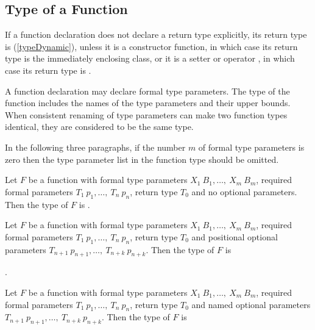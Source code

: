 \documentclass{article}
\begin{document}
\subsection{Type of a Function}

\LMHash{}
If a function declaration does not declare a return type explicitly, its return type is \DYNAMIC{} (\ref{typeDynamic}),
unless it is a constructor function, in which case its return type is the immediately enclosing class,
or it is a setter or operator \code{[]=}, in which case its return type is \VOID{}.

\LMHash{}
A function declaration may declare formal type parameters.
The type of the function includes the names of the type parameters and their upper bounds.
When consistent renaming of type parameters can make two function types identical,
they are considered to be the same type.


\LMHash{}
In the following three paragraphs,
if the number $m$ of formal type parameters is zero then the type parameter list in the function type should be omitted.

\LMHash{}
Let $F$ be a function with
formal type parameters $X_1\ B_1, \ldots,\ X_m\ B_m$,
required formal parameters $T_1\ p_1, \ldots,\ T_n\ p_n$,
return type $T_0$
and no optional parameters.
Then the type of $F$ is
.

\LMHash{}
Let $F$ be a function with
formal type parameters $X_1\ B_1, \ldots,\ X_m\ B_m$,
required formal parameters $T_1\ p_1, \ldots,\ T_n\ p_n$,
return type $T_0$
and positional optional parameters $T_{n+1}\ p_{n+1}, \ldots,\ T_{n+k}\ p_{n+k}$.
Then the type of $F$ is

.

\LMHash{}
Let $F$ be a function with
formal type parameters $X_1\ B_1, \ldots,\ X_m\ B_m$,
required formal parameters $T_1\ p_1, \ldots,\ T_n\ p_n$,
return type $T_0$
and named optional parameters $T_{n+1}\ p_{n+1}, \ldots,\ T_{n+k}\ p_{n+k}$.
Then the type of $F$ is
\end{document}
